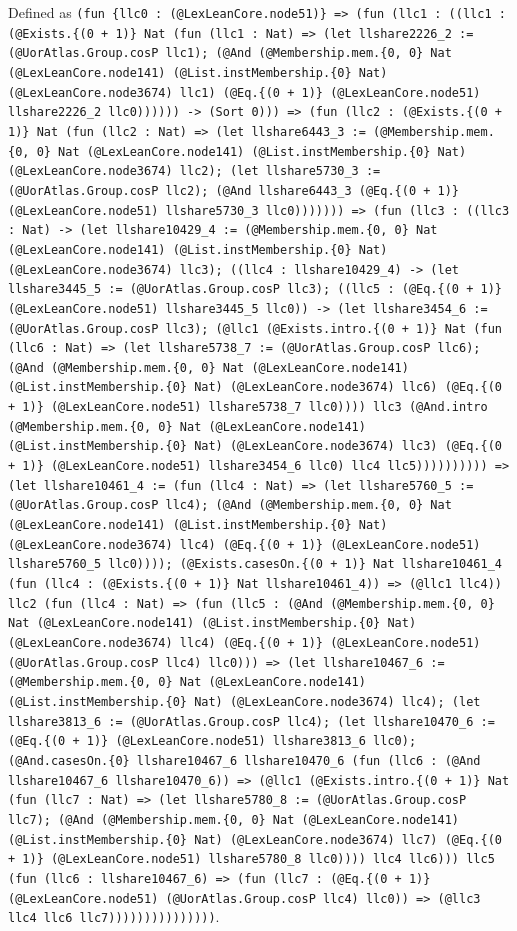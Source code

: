 \documentclass[11pt]{article}
\begin{document}
\noindent Defined as \texttt{(fun \{llc0 : (@LexLeanCore.node51)\} => (fun (llc1 : ((llc1 : (@Exists.\{(0 + 1)\} Nat (fun (llc1 : Nat) => (let llshare2226\_2 := (@UorAtlas.Group.cosP llc1); (@And (@Membership.mem.\{0, 0\} Nat (@LexLeanCore.node141) (@List.instMembership.\{0\} Nat) (@LexLeanCore.node3674) llc1) (@Eq.\{(0 + 1)\} (@LexLeanCore.node51) llshare2226\_2 llc0)))))) -> (Sort 0))) => (fun (llc2 : (@Exists.\{(0 + 1)\} Nat (fun (llc2 : Nat) => (let llshare6443\_3 := (@Membership.mem.\{0, 0\} Nat (@LexLeanCore.node141) (@List.instMembership.\{0\} Nat) (@LexLeanCore.node3674) llc2); (let llshare5730\_3 := (@UorAtlas.Group.cosP llc2); (@And llshare6443\_3 (@Eq.\{(0 + 1)\} (@LexLeanCore.node51) llshare5730\_3 llc0))))))) => (fun (llc3 : ((llc3 : Nat) -> (let llshare10429\_4 := (@Membership.mem.\{0, 0\} Nat (@LexLeanCore.node141) (@List.instMembership.\{0\} Nat) (@LexLeanCore.node3674) llc3); ((llc4 : llshare10429\_4) -> (let llshare3445\_5 := (@UorAtlas.Group.cosP llc3); ((llc5 : (@Eq.\{(0 + 1)\} (@LexLeanCore.node51) llshare3445\_5 llc0)) -> (let llshare3454\_6 := (@UorAtlas.Group.cosP llc3); (@llc1 (@Exists.intro.\{(0 + 1)\} Nat (fun (llc6 : Nat) => (let llshare5738\_7 := (@UorAtlas.Group.cosP llc6); (@And (@Membership.mem.\{0, 0\} Nat (@LexLeanCore.node141) (@List.instMembership.\{0\} Nat) (@LexLeanCore.node3674) llc6) (@Eq.\{(0 + 1)\} (@LexLeanCore.node51) llshare5738\_7 llc0)))) llc3 (@And.intro (@Membership.mem.\{0, 0\} Nat (@LexLeanCore.node141) (@List.instMembership.\{0\} Nat) (@LexLeanCore.node3674) llc3) (@Eq.\{(0 + 1)\} (@LexLeanCore.node51) llshare3454\_6 llc0) llc4 llc5)))))))))) => (let llshare10461\_4 := (fun (llc4 : Nat) => (let llshare5760\_5 := (@UorAtlas.Group.cosP llc4); (@And (@Membership.mem.\{0, 0\} Nat (@LexLeanCore.node141) (@List.instMembership.\{0\} Nat) (@LexLeanCore.node3674) llc4) (@Eq.\{(0 + 1)\} (@LexLeanCore.node51) llshare5760\_5 llc0)))); (@Exists.casesOn.\{(0 + 1)\} Nat llshare10461\_4 (fun (llc4 : (@Exists.\{(0 + 1)\} Nat llshare10461\_4)) => (@llc1 llc4)) llc2 (fun (llc4 : Nat) => (fun (llc5 : (@And (@Membership.mem.\{0, 0\} Nat (@LexLeanCore.node141) (@List.instMembership.\{0\} Nat) (@LexLeanCore.node3674) llc4) (@Eq.\{(0 + 1)\} (@LexLeanCore.node51) (@UorAtlas.Group.cosP llc4) llc0))) => (let llshare10467\_6 := (@Membership.mem.\{0, 0\} Nat (@LexLeanCore.node141) (@List.instMembership.\{0\} Nat) (@LexLeanCore.node3674) llc4); (let llshare3813\_6 := (@UorAtlas.Group.cosP llc4); (let llshare10470\_6 := (@Eq.\{(0 + 1)\} (@LexLeanCore.node51) llshare3813\_6 llc0); (@And.casesOn.\{0\} llshare10467\_6 llshare10470\_6 (fun (llc6 : (@And llshare10467\_6 llshare10470\_6)) => (@llc1 (@Exists.intro.\{(0 + 1)\} Nat (fun (llc7 : Nat) => (let llshare5780\_8 := (@UorAtlas.Group.cosP llc7); (@And (@Membership.mem.\{0, 0\} Nat (@LexLeanCore.node141) (@List.instMembership.\{0\} Nat) (@LexLeanCore.node3674) llc7) (@Eq.\{(0 + 1)\} (@LexLeanCore.node51) llshare5780\_8 llc0)))) llc4 llc6))) llc5 (fun (llc6 : llshare10467\_6) => (fun (llc7 : (@Eq.\{(0 + 1)\} (@LexLeanCore.node51) (@UorAtlas.Group.cosP llc4) llc0)) => (@llc3 llc4 llc6 llc7)))))))))))))))}.\par
\end{document}
